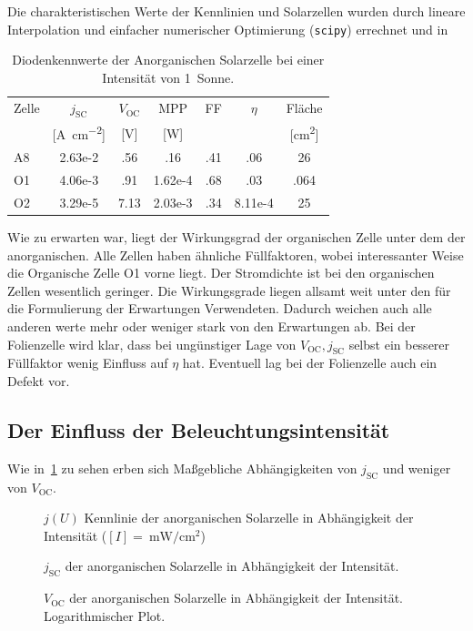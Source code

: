 \documentclass[slug=SZ, room=Hermann-Krone-Bau\,\ Labor\ 1.25,
supervisor=Martin\ Kroll, coursedate=14.\ 11.\ 2019]{../../Lab_Report_LaTeX/lab_report}
\newcommand{\sun}[1]{\SI{#1}{Sonne}}
\newcommand{\mwcm}[1]{\SI{#1}{\milli\watt\per\centi\meter^2}}
\newcommand{\voc}{V_{\text{OC}}}
\newcommand{\jsc}{j_{\text{SC}}}
\begin{document}
Die charakteristischen Werte der Kennlinien und Solarzellen wurden
durch lineare Interpolation und einfacher numerischer Optimierung
(\verb|scipy|) errechnet und in

\begin{table}[h]
  \centering
  \begin{tabular}{l|SSSSSS}
    \toprule
    Zelle & {\(\jsc\)} & {\(\voc\)} & {MPP}
    & {FF} & {\(\eta\)} & {Fl\"ache}\\
    {} & {[\si{A\per\centi\meter^2}]} & {[\si{\volt}]} & {[\si{\watt}]}
    & {} & {} & {[\si{\centi\meter^2}]}\\
    \midrule
    A8 & 2.63e-2 & .56 & .16 & .41 & .06 & 26 \\
    O1 & 4.06e-3 & .91 & 1.62e-4 & .68 & .03 & .064\\
    O2 & 3.29e-5 & 7.13 & 2.03e-3 & .34 & 8.11e-4 & 25 \\
  \end{tabular}
  \caption{Diodenkennwerte der Anorganischen Solarzelle bei einer
    Intensit\"at von \sun{1}.}
  \label{tab:diodano}
\end{table}

Wie zu erwarten war, liegt der Wirkungsgrad der organischen Zelle
unter dem der anorganischen. Alle Zellen haben \"ahnliche
F\"ullfaktoren, wobei interessanter Weise die Organische Zelle O1
vorne liegt.
Der Stromdichte ist bei den organischen Zellen wesentlich geringer.
Die Wirkungsgrade liegen allsamt weit unter den f\"ur die Formulierung
der Erwartungen Verwendeten. Dadurch weichen auch alle anderen werte
mehr oder weniger stark von den Erwartungen ab.
Bei der Folienzelle wird klar, dass bei ung\"unstiger Lage von
\(\voc, \jsc\) selbst ein besserer F\"ullfaktor wenig Einfluss auf
\(\eta\) hat. Eventuell lag bei der Folienzelle auch ein Defekt vor.



\subsection{Der Einfluss der Beleuchtungsintensität}
\label{sec:auswintens}

Wie in~\ref{fig:b-all} zu sehen erben sich Ma\ss{}gebliche
Abh\"angigkeiten von \(\jsc\) und weniger von \(\voc\).
\begin{figure}[H]\centering
  
  \caption{\(j(U)\) Kennlinie der anorganischen Solarzelle in
    Abhängigkeit der Intensität (\([I] = \mwcm{}\))  }
  \label{fig:b-all}
\end{figure}
\begin{figure}[H]\centering
  
  \caption{\(\jsc\)  der anorganischen Solarzelle in
    Abhängigkeit der Intensität.}
  \label{fig:b-jsc}
\end{figure}
\begin{figure}[H]\centering
  
  \caption{\(\voc\) der anorganischen Solarzelle in
    Abhängigkeit der Intensität. Logarithmischer Plot.}
  \label{fig:b-voc}
\end{figure}
\end{document}
